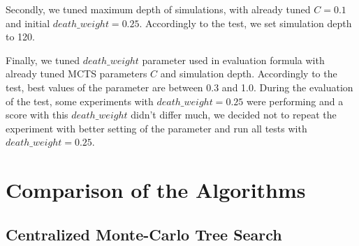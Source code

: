 Secondly, we tuned maximum depth of simulations, with already tuned $C=0.1$ and initial
$death\_weight=0.25$. Accordingly to the test, we set simulation depth to 120.

Finally, we tuned $death\_weight$ parameter used in evaluation formula with already tuned MCTS
parameters $C$ and simulation depth. Accordingly to the test, best values of the parameter are
between 0.3 and 1.0. During the evaluation of the test, some experiments with
$death\_weight=0.25$ were performing and a score with this $death\_weight$ didn't differ much,
we decided not to repeat the experiment with better setting of the parameter and run all tests
with $death\_weight=0.25$.



\section{Comparison of the Algorithms}

\subsection{Centralized Monte-Carlo Tree Search}


